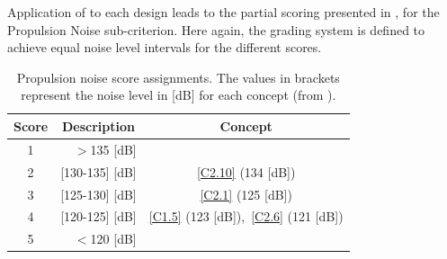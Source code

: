 Application of  to each design leads to the partial scoring presented in , for the Propulsion Noise sub-criterion.
Here again, the grading system is defined to achieve equal noise level intervals for the different scores.
\begin{table}[ht]
\centering
\caption{Propulsion noise score assignments. The values in brackets represent the noise level in [dB] for each concept (from ).}
\label{tab:prop_noise}
\begin{tabular}{c|r|c}
\toprule
\textbf{Score} & \multicolumn{1}{c|}{\textbf{Description}} & \textbf{Concept} \\ \bottomrule
\rowcolor[HTML]{FD6864} 
1              & $>$135 [dB]              &                  \\
\rowcolor[HTML]{FCBF7B} 
2              & [130-135] [dB]              & \ref{C2.10} (134 [dB])            \\
\rowcolor[HTML]{E0E383} 
3              & [125-130] [dB]             & \ref{C2.1} (125 [dB])             \\
\rowcolor[HTML]{A2D07F} 
4              & [120-125] [dB]             & \ref{C1.5} (123 [dB]),~\ref{C2.6} (121 [dB])        \\
\rowcolor[HTML]{63BE7B} 
5              & $<$120 [dB]                 &                  \\ \toprule
\end{tabular}
\end{table}

